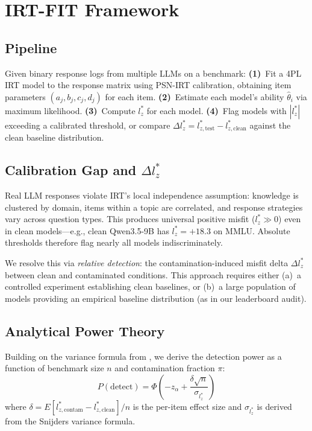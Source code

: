 \documentclass[11pt,a4paper]{article}
\begin{document}
\section{IRT-FIT Framework}

\subsection{Pipeline}

Given binary response logs from multiple LLMs on a benchmark:
\textbf{(1)}~Fit a 4PL IRT model to the response matrix using PSN-IRT calibration, obtaining item parameters $(a_j, b_j, c_j, d_j)$ for each item.
\textbf{(2)}~Estimate each model's ability $\hat{\theta}_i$ via maximum likelihood.
\textbf{(3)}~Compute $l_z^*$ for each model.
\textbf{(4)}~Flag models with $|l_z^*|$ exceeding a calibrated threshold, or compare $\Delta l_z^* = l_{z,\text{test}}^* - l_{z,\text{clean}}^*$ against the clean baseline distribution.

\subsection{Calibration Gap and $\Delta l_z^*$}

Real LLM responses violate IRT's local independence assumption: knowledge is clustered by domain, items within a topic are correlated, and response strategies vary across question types.
This produces universal positive misfit ($l_z^* \gg 0$) even in clean models---e.g., clean Qwen3.5-9B has $l_z^* = +18.3$ on MMLU.
Absolute thresholds therefore flag nearly all models indiscriminately.

We resolve this via \emph{relative detection}: the contamination-induced misfit delta $\Delta l_z^*$ between clean and contaminated conditions.
This approach requires either (a)~a controlled experiment establishing clean baselines, or (b)~a large population of models providing an empirical baseline distribution (as in our leaderboard audit).

\subsection{Analytical Power Theory}
\label{sec:power-theory}

Building on the variance formula from \citet{snijders2001}, we derive the detection power as a function of benchmark size $n$ and contamination fraction $\pi$:
\begin{equation}
P(\text{detect}) = \Phi\!\left(-z_\alpha + \frac{\delta \sqrt{n}}{\sigma_{l_z^*}}\right)
\end{equation}
where $\delta = E[l_{z,\text{contam}}^* - l_{z,\text{clean}}^*]/n$ is the per-item effect size and $\sigma_{l_z^*}$ is derived from the Snijders variance formula.
\end{document}
